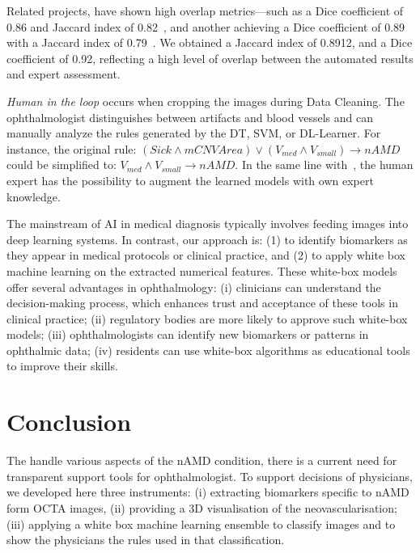 \documentclass[conference]{IEEEtran}
\begin{document}

Related projects, have shown high overlap metrics—such as a Dice coefficient of 0.86 and Jaccard index of 0.82~\cite{compare1}, and another achieving a Dice coefficient of 0.89 with a Jaccard index of 0.79~\cite{compare2}. 
We obtained a Jaccard index of 0.8912,  and a Dice coefficient of 0.92, reflecting a high level of overlap between the automated results and expert assessment. 

\textit{Human in the loop} occurs when cropping the images during Data Cleaning. The ophthalmologist distinguishes between artifacts and blood vessels and can manually analyze the rules generated by the DT, SVM, or DL-Learner. 
For instance, the original rule: $(Sick \land mCNVArea) \lor (V_{med} \land V_{small}) \rightarrow nAMD$ could be simplified to: $V_{med} \land V_{small} \rightarrow nAMD$. In the same line with~\cite{groza2021agents}, the human expert has the possibility to augment the learned models with own expert knowledge. 

The mainstream of AI in medical diagnosis typically involves feeding images into deep learning systems. In contrast, our approach is: (1) to identify biomarkers as they appear in medical protocols or clinical practice, and 
(2) to apply white box machine learning on the extracted numerical features. 
These white-box models offer several advantages in ophthalmology:
(i) clinicians can understand the decision-making process, which enhances trust and acceptance of these tools in clinical practice; 
(ii) regulatory bodies are more likely to approve such white-box models;
(iii) ophthalmologists can identify new biomarkers or patterns in ophthalmic data; 
(iv) residents can use white-box algorithms as educational tools to improve their skills.


\section{Conclusion}
The handle various aspects of the nAMD condition, there is a current need for transparent support tools for ophthalmologist.  %
To support decisions of physicians, we developed here three instruments: (i) extracting biomarkers specific to nAMD form OCTA images, (ii) providing a 3D visualisation of the neovascularisation; (iii) applying a white box machine learning ensemble to classify images and to show the physicians the rules used in that classification.      %


 


  
\end{document}

